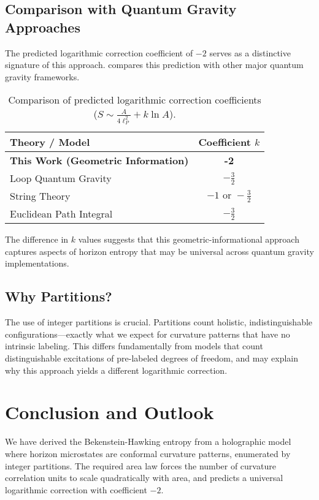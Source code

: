 \documentclass[12pt, letterpaper]{article}
\begin{document}
\subsection{Comparison with Quantum Gravity Approaches}
The predicted logarithmic correction coefficient of $-2$ serves as a distinctive signature of this approach.  compares this prediction with other major quantum gravity frameworks.

\begin{table}[h!]
\centering
\caption{Comparison of predicted logarithmic correction coefficients ($S \sim \frac{A}{4\ell_P^2} + k \ln A$).}
\label{tab:comparison}
\begin{tabular}{lc}
\toprule
\textbf{Theory / Model} & \textbf{Coefficient $k$} \\
\midrule
\textbf{This Work (Geometric Information)} & \textbf{-2} \\
Loop Quantum Gravity \cite{kaul2000} & $-\frac{3}{2}$ \\
String Theory \cite{sen2012} & $-1 \text{ or } -\frac{3}{2}$ \\
Euclidean Path Integral & $-\frac{3}{2}$ \\
\bottomrule
\end{tabular}
\end{table}

The difference in $k$ values suggests that this geometric-informational approach captures aspects of horizon entropy that may be universal across quantum gravity implementations.

\subsection{Why Partitions?}
The use of integer partitions is crucial. Partitions count holistic, indistinguishable configurations—exactly what we expect for curvature patterns that have no intrinsic labeling. This differs fundamentally from models that count distinguishable excitations of pre-labeled degrees of freedom, and may explain why this approach yields a different logarithmic correction.

\section{Conclusion and Outlook}
\label{sec:conclusion}

We have derived the Bekenstein-Hawking entropy from a holographic model where horizon microstates are conformal curvature patterns, enumerated by integer partitions. The required area law forces the number of curvature correlation units to scale quadratically with area, and predicts a universal logarithmic correction with coefficient $-2$.
\end{document}
